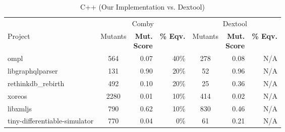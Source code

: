 \documentclass[sigconf,review, anonymous]{acmart}
\begin{document}
\begin{table}[htbp]
\centering
{\small
\caption{C++ (Our Implementation vs. Dextool)}
\label{tab:table_cpp2}
\begin{tabularx}{\columnwidth}{X|crr|crr}
\hline
        & \multicolumn{3}{c|}{Comby}  & \multicolumn{3}{c}{Dextool} \\ 
Project & Mutants & \makecell{\textbf{Mut.} \\ \textbf{Score}} & \textbf{\% Eqv.} & Mutants & \makecell{\textbf{Mut.} \\ \textbf{Score}} & \textbf{\% Eqv.} \\[1ex]\midrule
 ompl &  564 & 0.07 & 40\% & 278 & 0.08 & N/A \\
 libgraphqlparser &  131 & 0.90 & 20\% & 52 & 0.96 & N/A \\
 rethinkdb\_rebirth &  492 & 0.10 & 20\% & 25 & 0.36 & N/A \\
 xoreos &  2280 & 0.01 & 10\% & 414 & 0.02 & N/A \\
 libxmljs &  790 & 0.62 & 10\% & 830 & 0.46 & N/A \\
 tiny-differentiable-simulator &  770 & 0.04 & 0\% & 61 & 0.21 & N/A \\

    

\end{tabularx}}
\end{table}
\end{document}
